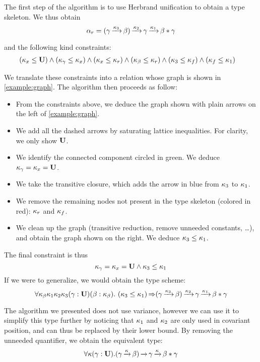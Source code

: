 The first step of the algorithm is to use Herbrand unification to obtain
a type skeleton. We thus obtain
$$\alpha_r =
(\gamma \operatorname{\xrightarrow{\kappa_3}} \beta) \operatorname{\xrightarrow{\kappa_2}} \gamma \operatorname{\xrightarrow{\kappa_1}} \beta * \gamma$$

and the following kind constraints: 
\[\begin{aligned}
    &(\kappa_x \leq \mathbf{U})
    \wedge
    (\kappa_\gamma \leq \kappa_x)
    \wedge
    (\kappa_x \leq \kappa_r)
    \wedge
    (\kappa_\beta \leq \kappa_r)
    \wedge
    (\kappa_3 \leq \kappa_f)
    \wedge
    (\kappa_f \leq \kappa_1)
\end{aligned}\]

We translate these constraints into a relation whose graph
is shown in \cref{example:graph}.
%
The algorithm then proceeds as follow:
\begin{itemize}[noitemsep]
\item From the constraints above, we deduce the graph shown
  with plain arrows on the left of \cref{example:graph}.
\item We add all the dashed arrows by saturating
  lattice inequalities. For clarity, we only show $\mathbf{U}$.
\item We identify the connected component circled in
  {\color{green} green}.
  We deduce $\kappa_\gamma = \kappa_x = \mathbf{U}$.
\item We take the transitive closure, which adds the
  arrow in {\color{blue} blue} from $\kappa_3$ to $\kappa_1$.
\item We remove the remaining nodes not present in the type skeleton (colored in {\color{red} red}): $\kappa_r$ and $\kappa_f$.
\item We clean up the graph (transitive reduction, remove unneeded constants, \dots),
  and obtain the graph shown on the right.
  We deduce $\kappa_3 \leq \kappa_1$.
\end{itemize}

The final constraint is thus
$$\kappa_\gamma = \kappa_x = \mathbf{U} \wedge \kappa_3 \leq \kappa_1$$
If we were to generalize, we would obtain the type scheme:
$$\forall \kvar_\beta \kvar_1 \kvar_2 \kvar_3
(\gamma : \kun) (\beta : \kvar_\beta).\ %
\qual
{\Cleq{\kvar_3}{\kvar_1}}
{(\gamma \tarr{\kvar_3} \beta) \tarr{\kvar_2} \gamma \tarr{\kvar_1} \beta * \gamma}$$

The algorithm we presented does not use variance, however we can use it to
simplify this type further by noticing that $\kappa_1$ and $\kappa_2$ are only
used in covariant position, and can thus be replaced by their lower bound.
By removing the unneeded quantifier, we obtain the equivalent type:
$$
\forall \kappa
(\gamma : \mathbf{U}).
{(\gamma \operatorname{\xrightarrow{\kappa}} \beta) \operatorname{\xrightarrow{}} \gamma \operatorname{\xrightarrow{\kappa}} \beta * \gamma}$$



